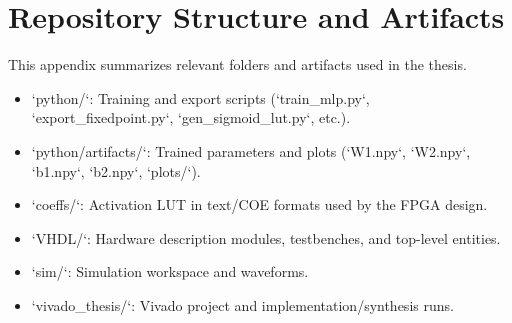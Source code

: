 \chapter{Repository Structure and Artifacts}
\label{app:repo}
This appendix summarizes relevant folders and artifacts used in the thesis.

\begin{itemize}
    \item `python/`: Training and export scripts (`train_mlp.py`, `export_fixedpoint.py`, `gen_sigmoid_lut.py`, etc.).
    \item `python/artifacts/`: Trained parameters and plots (`W1.npy`, `W2.npy`, `b1.npy`, `b2.npy`, `plots/`).
    \item `coeffs/`: Activation LUT in text/COE formats used by the FPGA design.
    \item `VHDL/`: Hardware description modules, testbenches, and top-level entities.
    \item `sim/`: Simulation workspace and waveforms.
    \item `vivado_thesis/`: Vivado project and implementation/synthesis runs.
\end{itemize}
